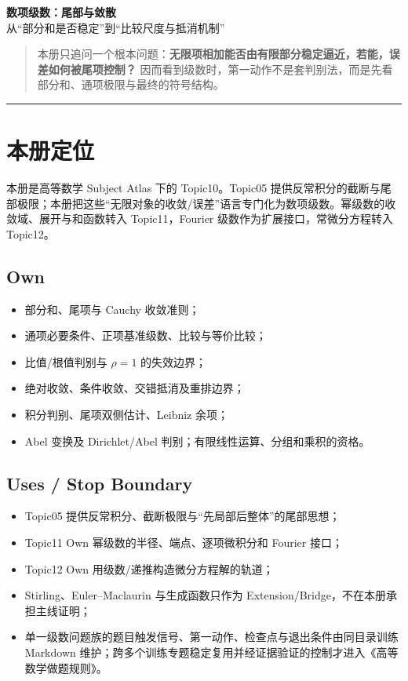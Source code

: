 \documentclass[11pt,a4paper,fontset=fandol]{ctexart}
\begin{document}
\begin{center}
{\LARGE\textbf{数项级数：尾部与敛散}}\\[0.4em]
{\large 从“部分和是否稳定”到“比较尺度与抵消机制”}
\end{center}
\vspace{0.4em}
\begin{quote}
本册只追问一个根本问题：\textbf{无限项相加能否由有限部分稳定逼近，若能，误差如何被尾项控制？} 因而看到级数时，第一动作不是套判别法，而是先看部分和、通项极限与最终的符号结构。
\end{quote}
\begin{center}\rule{0.5\linewidth}{0.5pt}\end{center}

\setcounter{section}{-1}
\section{本册定位}
本册是高等数学 Subject Atlas 下的 Topic10。Topic05 提供反常积分的截断与尾部极限；本册把这些“无限对象的收敛/误差”语言专门化为数项级数。幂级数的收敛域、展开与和函数转入 Topic11，Fourier 级数作为扩展接口，常微分方程转入 Topic12。

\subsection{Own}
\begin{itemize}
  \item 部分和、尾项与 Cauchy 收敛准则；
  \item 通项必要条件、正项基准级数、比较与等价比较；
  \item 比值/根值判别与 $\rho=1$ 的失效边界；
  \item 绝对收敛、条件收敛、交错抵消及重排边界；
  \item 积分判别、尾项双侧估计、Leibniz 余项；
  \item Abel 变换及 Dirichlet/Abel 判别；有限线性运算、分组和乘积的资格。
\end{itemize}

\subsection{Uses / Stop Boundary}
\begin{itemize}
  \item Topic05 提供反常积分、截断极限与“先局部后整体”的尾部思想；
  \item Topic11 Own 幂级数的半径、端点、逐项微积分和 Fourier 接口；
  \item Topic12 Own 用级数/递推构造微分方程解的轨道；
  \item Stirling、Euler--Maclaurin 与生成函数只作为 Extension/Bridge，不在本册承担主线证明；
  \item 单一级数问题族的题目触发信号、第一动作、检查点与退出条件由同目录训练 Markdown 维护；跨多个训练专题稳定复用并经证据验证的控制才进入《高等数学做题规则》。
\end{itemize}
\end{document}
